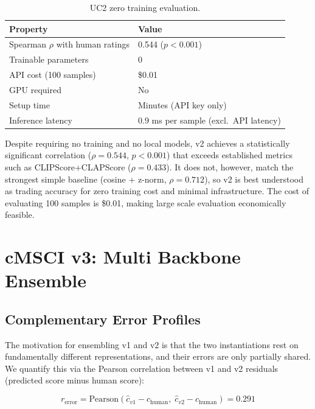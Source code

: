 \documentclass[a4paper,fleqn]{cas-sc}
\begin{document}
\begin{itemize}
\begin{table}[t]
\caption{UC2 zero training evaluation.}\label{tab:uc2}
\centering
\begin{tabular}{ll}
\toprule
Property & Value \\
\midrule
Spearman $\rho$ with human ratings & 0.544 ($p < 0.001$) \\
Trainable parameters & 0 \\
API cost (100 samples) & \$0.01 \\
GPU required & No \\
Setup time & Minutes (API key only) \\
Inference latency & 0.9 ms per sample (excl.\ API latency) \\
\bottomrule
\end{tabular}
\end{table}

Despite requiring no training and no local models, v2 achieves a statistically significant correlation ($\rho = 0.544$, $p < 0.001$) that exceeds established metrics such as CLIPScore+CLAPScore ($\rho = 0.433$). It does not, however, match the strongest simple baseline (cosine + z-norm, $\rho = 0.712$), so v2 is best understood as trading accuracy for zero training cost and minimal infrastructure. The cost of evaluating 100 samples is \$0.01, making large scale evaluation economically feasible.

\section{cMSCI v3: Multi Backbone Ensemble}\label{sec:v3}

\subsection{Complementary Error Profiles}\label{sec:v3-errors}

The motivation for ensembling v1 and v2 is that the two instantiations rest on fundamentally different representations, and their errors are only partially shared. We quantify this via the Pearson correlation between v1 and v2 residuals (predicted score minus human score):

\begin{equation}\label{eq:error-corr}
r_{\mathrm{error}} = \mathrm{Pearson}(\hat{c}_{v1} - c_{\mathrm{human}}, \; \hat{c}_{v2} - c_{\mathrm{human}}) = 0.291
\end{equation}


\end{itemize}
\end{document}
